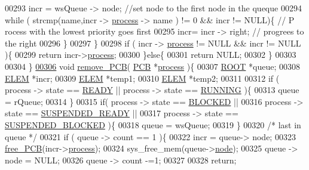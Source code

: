 \begin{DoxyCode}
{{00293         incr =  wsQueue -> node; \textcolor{comment}{//set node to the first node in the queque}
00294         \textcolor{keywordflow}{while} ( strcmp(name,incr -> \hyperlink{structprocess}{process} -> name ) != 0 && incr != NULL)\{ \textcolor{comment}{// P
      rocess with the lowest priority goes first }
00295                         incr= incr -> right; \textcolor{comment}{// progrees to the right }
00296         \}
00297         \}
00298         \textcolor{keywordflow}{if} ( incr -> \hyperlink{structprocess}{process} != NULL && incr != NULL )\{
00299                 \textcolor{keywordflow}{return} incr->\hyperlink{structpage_af3cc0e1320b79159b230f154f1a95f0d}{process};
00300         \}\textcolor{keywordflow}{else}\{
00301                 \textcolor{keywordflow}{return} NULL;
00302         \}
00303 
00304 \}
\hypertarget{mpx__r2_8c_source_l00306}{}\hyperlink{mpx__r2_8c_af30a3658210d449b4b53e5be2ed2bc2e}{00306} \textcolor{keywordtype}{void} \hyperlink{mpx__r2_8c_af30a3658210d449b4b53e5be2ed2bc2e}{remove_PCB}( \hyperlink{structprocess}{PCB} *\hyperlink{structprocess}{process} )\{
00307         \hyperlink{structroot}{ROOT} *queue;
00308         \hyperlink{structpage}{ELEM} *incr;
00309         \hyperlink{structpage}{ELEM} *temp1;
00310         \hyperlink{structpage}{ELEM} *temp2;
00311         
00312         \textcolor{keywordflow}{if} ( process -> state == \hyperlink{mpx__r2_8h_ad1235d5ce36f7267285e82dccd428aa6}{READY} || process -> state == \hyperlink{mpx__r2_8h_a6fb7181d994ee98e735494be55809708}{RUNNING} )\{
00313                 queue = rQueue;
00314         \}
00315         \textcolor{keywordflow}{if}( process -> state == \hyperlink{mpx__r2_8h_a48f6457243719e7031768d4100741159}{BLOCKED} || 
00316                 process -> state == \hyperlink{mpx__r2_8h_a07b1141143e8825b04670da23fca8cc7}{SUSPENDED_READY} || 
00317                 process -> state == \hyperlink{mpx__r2_8h_a6e41bb5a80c5049e8d364bab8ee4d73a}{SUSPENDED_BLOCKED} )\{
00318                 queue = wsQueue;
00319         \}
00320         \textcolor{comment}{/* last in queue */}
00321         \textcolor{keywordflow}{if} ( queue -> count == 1 )\{
00322                 incr = queue-> node;
00323                 \hyperlink{mpx__r2_8c_a79890f055b1d0fccf1962bbde4877caa}{free_PCB}(incr->\hyperlink{structpage_af3cc0e1320b79159b230f154f1a95f0d}{process});
00324                 sys\_free\_mem(queue->\hyperlink{structroot_acf8c9d6dbd37a892a1b45394c1595f1a}{node});
00325                 queue -> node = NULL;
00326                 queue -> count -=1;
00327                 
00328                 \textcolor{keywordflow}{return};
}}
\end{DoxyCode}
